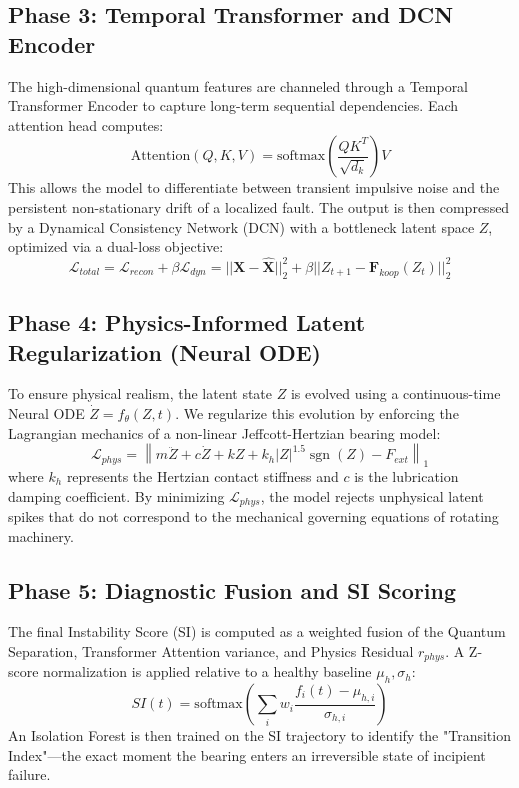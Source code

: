 \documentclass[a4paper,fleqn]{cas-dc}
\begin{document}
\subsection{Phase 3: Temporal Transformer and DCN Encoder}
The high-dimensional quantum features are channeled through a Temporal Transformer Encoder to capture long-term sequential dependencies. Each attention head computes:
\begin{equation}
    \text{Attention}(Q, K, V) = \text{softmax}\left(\frac{QK^T}{\sqrt{d_k}}\right)V
\end{equation}
This allows the model to differentiate between transient impulsive noise and the persistent non-stationary drift of a localized fault. The output is then compressed by a Dynamical Consistency Network (DCN) with a bottleneck latent space $Z$, optimized via a dual-loss objective:
\begin{equation}
    \mathcal{L}_{total} = \mathcal{L}_{recon} + \beta \mathcal{L}_{dyn} = ||\mathbf{X} - \hat{\mathbf{X}}||_2^2 + \beta ||Z_{t+1} - \mathbf{F}_{koop}(Z_t)||_2^2
\end{equation}

\subsection{Phase 4: Physics-Informed Latent Regularization (Neural ODE)}
To ensure physical realism, the latent state $Z$ is evolved using a continuous-time Neural ODE $\dot{Z} = f_\theta(Z, t)$. We regularize this evolution by enforcing the Lagrangian mechanics of a non-linear Jeffcott-Hertzian bearing model:
\begin{equation}
    \mathcal{L}_{phys} = \left\| m\ddot{Z} + c\dot{Z} + kZ + k_h |Z|^{1.5} \operatorname{sgn}(Z) - F_{ext} \right\|_1
\end{equation}
where $k_h$ represents the Hertzian contact stiffness and $c$ is the lubrication damping coefficient. By minimizing $\mathcal{L}_{phys}$, the model rejects unphysical latent spikes that do not correspond to the mechanical governing equations of rotating machinery.

\subsection{Phase 5: Diagnostic Fusion and SI Scoring}
The final Instability Score (SI) is computed as a weighted fusion of the Quantum Separation, Transformer Attention variance, and Physics Residual $r_{phys}$. A Z-score normalization is applied relative to a healthy baseline $\mu_h, \sigma_h$:
\begin{equation}
    SI(t) = \text{softmax} \left( \sum_{i} w_i \frac{f_i(t) - \mu_{h,i}}{\sigma_{h,i}} \right)
\end{equation}
An Isolation Forest is then trained on the SI trajectory to identify the "Transition Index"—the exact moment the bearing enters an irreversible state of incipient failure.
\end{document}
